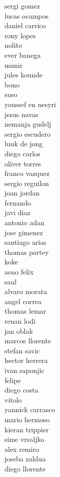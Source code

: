 \documentclass[]{article}
\begin{document}
{sergi gomez\\
lucas ocampos\\
daniel carrico\\
rony lopes\\
nolito\\
ever banega\\
munir\\
jules kounde\\
bono\\
suso\\
youssef en nesyri\\
jesus navas\\
nemanja gudelj\\
sergio escudero\\
luuk de jong\\
diego carlos\\
oliver torres\\
franco vazquez\\
sergio reguilon\\
joan jordan\\
fernando\\
javi diaz\\
antonio adan\\
jose gimenez\\
santiago arias\\
thomas partey\\
koke\\
aoao felix\\
saul\\
alvaro morata\\
angel correa\\
thomas lemar\\
renan lodi\\
jan oblak\\
marcos llorente\\
stefan savic\\
hector herrera\\
ivan saponjic\\
felipe\\
diego costa\\
vitolo\\
yannick carrasco\\
mario hermoso\\
kieran trippier\\
sime vrsaljko\\
alex remiro\\
joseba zaldua\\
diego llorente\\
}
\end{document}
